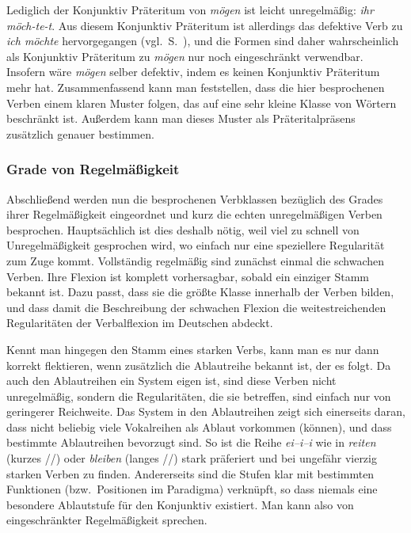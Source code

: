 Lediglich der Konjunktiv Präteritum von \textit{mögen} ist leicht unregelmäßig: \textit{ihr möch-te-t}.
Aus diesem Konjunktiv Präteritum ist allerdings das defektive Verb zu \textit{ich möchte} hervorgegangen (vgl.\ S.~\pageref{abs:9z32fqgsve}), und die Formen sind daher wahrscheinlich als Konjunktiv Präteritum zu \textit{mögen} nur noch eingeschränkt verwendbar.
Insofern wäre \textit{mögen} selber defektiv, indem es keinen Konjunktiv Präteritum mehr hat.
Zusammenfassend kann man feststellen, dass die hier besprochenen Verben einem klaren Muster folgen, das auf eine sehr kleine Klasse von Wörtern beschränkt ist.
Außerdem kann man dieses Muster als Präteritalpräsens zusätzlich genauer bestimmen.

\subsubsection{Grade von Regelmäßigkeit}

\label{sec:graduellunregelmäßig}


Abschließend werden nun die besprochenen Verbklassen bezüglich des Grades ihrer Regelmäßigkeit eingeordnet und kurz die echten unregelmäßigen Verben besprochen.
Hauptsächlich ist dies deshalb nötig, weil viel zu schnell von Unregelmäßigkeit gesprochen wird, wo einfach nur eine speziellere Regularität zum Zuge kommt.
Vollständig regelmäßig sind zunächst einmal die schwachen Verben.
Ihre Flexion ist komplett vorhersagbar, sobald ein einziger Stamm bekannt ist.
Dazu passt, dass sie die größte Klasse innerhalb der Verben bilden, und dass damit die Beschreibung der schwachen Flexion die weitestreichenden Regularitäten der Verbalflexion im Deutschen abdeckt.

Kennt man hingegen den Stamm eines starken Verbs, kann man es nur dann korrekt flektieren, wenn zusätzlich die Ablautreihe bekannt ist, der es folgt.
Da auch den Ablautreihen ein System eigen ist, sind diese Verben nicht unregelmäßig, sondern die Regularitäten, die sie betreffen, sind einfach nur von geringerer Reichweite.
Das System in den Ablautreihen zeigt sich einerseits daran, dass nicht beliebig viele Vokalreihen als Ablaut vorkommen (können), und dass bestimmte Ablautreihen bevorzugt sind.
So ist \zB die Reihe \textit{ei--i--i} wie in \textit{reiten} (kurzes //) oder \textit{bleiben} (langes //) stark präferiert und bei ungefähr vierzig starken Verben zu finden.
Andererseits sind die Stufen klar mit bestimmten Funktionen (bzw.\ Positionen im Paradigma) verknüpft, so dass \zB niemals eine besondere Ablautstufe für den Konjunktiv existiert.
Man kann also von eingeschränkter Regelmäßigkeit sprechen.

